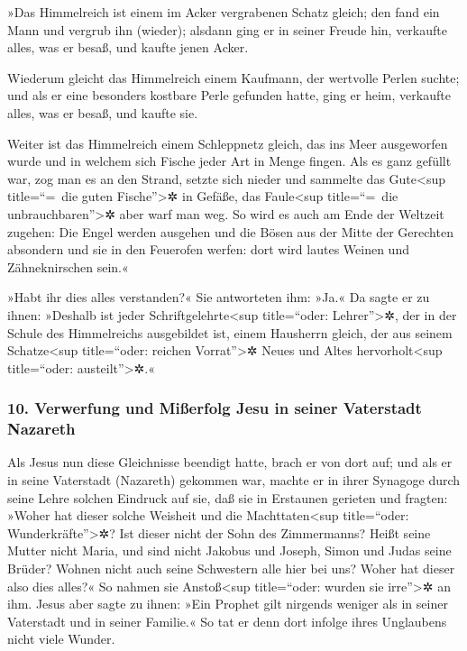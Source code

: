  »Das Himmelreich ist einem im Acker vergrabenen Schatz
gleich; den fand ein Mann und vergrub ihn (wieder); alsdann ging er in
seiner Freude hin, verkaufte alles, was er besaß, und kaufte jenen
Acker.

 Wiederum gleicht das Himmelreich einem Kaufmann, der
wertvolle Perlen suchte;  und als er eine besonders
kostbare Perle gefunden hatte, ging er heim, verkaufte alles, was er
besaß, und kaufte sie.

 Weiter ist das Himmelreich einem Schleppnetz gleich, das
ins Meer ausgeworfen wurde und in welchem sich Fische jeder Art in Menge
fingen.  Als es ganz gefüllt war, zog man es an den
Strand, setzte sich nieder und sammelte das Gute\textless sup
title=``=~die guten Fische''\textgreater✲ in Gefäße, das
Faule\textless sup title=``=~die unbrauchbaren''\textgreater✲ aber warf
man weg.  So wird es auch am Ende der Weltzeit zugehen:
Die Engel werden ausgehen und die Bösen aus der Mitte der Gerechten
absondern  und sie in den Feuerofen werfen: dort wird
lautes Weinen und Zähneknirschen sein.«

 »Habt ihr dies alles verstanden?« Sie antworteten ihm:
»Ja.«  Da sagte er zu ihnen: »Deshalb ist jeder
Schriftgelehrte\textless sup title=``oder: Lehrer''\textgreater✲, der in
der Schule des Himmelreichs ausgebildet ist, einem Hausherrn gleich, der
aus seinem Schatze\textless sup title=``oder: reichen
Vorrat''\textgreater✲ Neues und Altes hervorholt\textless sup
title=``oder: austeilt''\textgreater✲.«

\hypertarget{verwerfung-und-miuxdferfolg-jesu-in-seiner-vaterstadt-nazareth}{%
\subsubsection{10. Verwerfung und Mißerfolg Jesu in seiner Vaterstadt
Nazareth}\label{verwerfung-und-miuxdferfolg-jesu-in-seiner-vaterstadt-nazareth}}

 Als Jesus nun diese Gleichnisse beendigt hatte, brach er
von dort auf;  und als er in seine Vaterstadt (Nazareth)
gekommen war, machte er in ihrer Synagoge durch seine Lehre solchen
Eindruck auf sie, daß sie in Erstaunen gerieten und fragten: »Woher hat
dieser solche Weisheit und die Machttaten\textless sup title=``oder:
Wunderkräfte''\textgreater✲?  Ist dieser nicht der Sohn
des Zimmermanns? Heißt seine Mutter nicht Maria, und sind nicht Jakobus
und Joseph, Simon und Judas seine Brüder?  Wohnen nicht
auch seine Schwestern alle hier bei uns? Woher hat dieser also dies
alles?«  So nahmen sie Anstoß\textless sup title=``oder:
wurden sie irre''\textgreater✲ an ihm. Jesus aber sagte zu ihnen: »Ein
Prophet gilt nirgends weniger als in seiner Vaterstadt und in seiner
Familie.«  So tat er denn dort infolge ihres Unglaubens
nicht viele Wunder.

